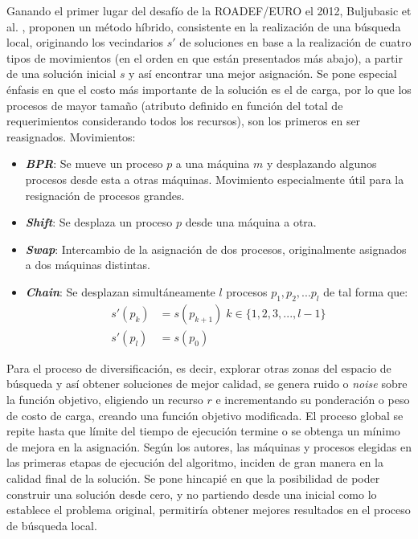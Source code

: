 Ganando el primer lugar \cite{2012ROADEFresults} del desafío de la ROADEF/EURO el 2012, Buljubasic et al. \cite{gavranovic2012variable}, proponen un método híbrido, consistente en la realización de una búsqueda local, originando los vecindarios $s'$ de soluciones en base a la realización de cuatro tipos de movimientos (en el orden en que están presentados más abajo), a partir de una solución inicial $s$ y así encontrar una mejor asignación. Se pone especial énfasis en que el costo más importante de la solución es el de carga, por lo que los procesos de mayor tamaño (atributo definido en función del total de requerimientos considerando todos los recursos), son los primeros en ser reasignados.
Movimientos:
\begin{itemize}
	\item \textbf{\emph{BPR}}: Se mueve un proceso $p$ a una máquina $m$ y desplazando algunos procesos desde esta a otras máquinas. Movimiento especialmente útil para la resignación de procesos grandes.	
	\item \textbf{\emph{Shift}}: Se desplaza un proceso $p$ desde una máquina a otra.
	\item \textbf{\emph{Swap}}:	Intercambio de la asignación de dos procesos, originalmente asignados a dos máquinas distintas.
	\item \textbf{\emph{Chain}}: Se desplazan simultáneamente $l$ procesos $p_1, p_2, ... p_l$ de tal forma que:
		\begin{align}
			s'(p_k) &= s(p_{k+1}) \; k \in \{1,2,3,...,l-1\} \nonumber \\
			s'(p_l) &= s(p_0) \nonumber
		\end{align}	
\end{itemize}  
Para el proceso de diversificación, es decir, explorar otras zonas del espacio de búsqueda y así obtener soluciones de mejor calidad, se genera ruido o \textit{noise} sobre la función objetivo, eligiendo un recurso $r$ e incrementando su ponderación o peso de costo de carga, creando una función objetivo modificada. El proceso global se repite hasta que límite del tiempo de ejecución termine o se obtenga un mínimo de mejora en la asignación. Según los autores, las máquinas y procesos elegidas en las primeras etapas de ejecución del algoritmo, inciden de gran manera en la calidad final de la solución. Se pone hincapié en que la posibilidad de poder construir una solución desde cero, y no partiendo desde una inicial como lo establece el problema original, permitiría obtener mejores resultados en el proceso de búsqueda local.\\

